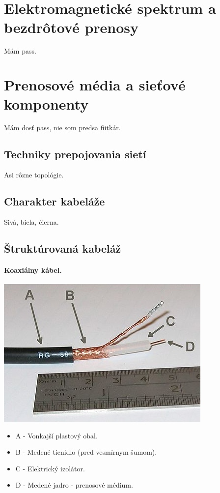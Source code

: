 \documentclass[10pt,a4paper]{article}
\begin{document}
\section{Elektromagnetické spektrum a bezdrôtové prenosy}  

Mám pass. 

\section{Prenosové média a sieťové komponenty} 
Mám dosť pass, nie som predsa fiitkár. 

\subsection{Techniky prepojovania sietí}  
Asi rôzne topológie. 

\subsection{Charakter kabeláže}     
Sivá, biela, čierna. 

\subsection{Štruktúrovaná kabeláž}  
\paragraph{Koaxiálny kábel.}
\begin{center}
\includegraphics{coaxial.jpg}
\end{center}
\begin{itemize}
\item A - Vonkajší plastový obal. 
\item B - Medené tienidlo (pred vesmírnym šumom). 
\item C - Elektrický izolátor.
\item D - Medené jadro - prenosové médium. 
\end{itemize}
\end{document}
